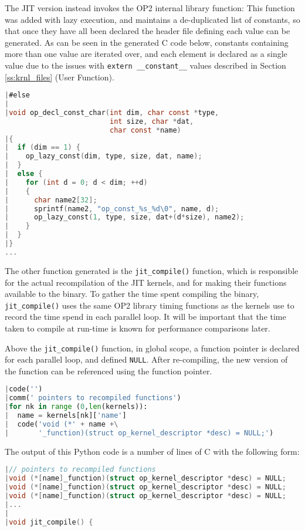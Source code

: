 The JIT version instead invokes the OP2 internal library function:
\noindent This function was added with lazy execution, and maintains a de-duplicated list of constants, so that once they have all been declared the header file defining each value can be generated. As can be seen in the generated C code below, constants containing more than one value are iterated over, and each element is declared as a single value due to the issues with \verb|extern __constant__| values described in Section \ref{ss:krnl_files} (User Function).
\begin{lstlisting}[backgroundcolor=\color{red!20}, language=C]
|#else
|
|void op_decl_const_char(int dim, char const *type,
                         int size, char *dat,
                         char const *name)
|{
|  if (dim == 1) {
|    op_lazy_const(dim, type, size, dat, name);
|  }
|  else {
|    for (int d = 0; d < dim; ++d)
|    {
|      char name2[32];
|      sprintf(name2, "op_const_%s_%d\0", name, d);
|      op_lazy_const(1, type, size, dat+(d*size), name2);
|    }
|  }
|}
...
\end{lstlisting}
\vspace{-1em}

The other function generated is the \verb|jit_compile()| function, which is responsible for the actual recompilation of the JIT kernels, and for making their functions available to the binary. To gather the time spent compiling the binary, \verb|jit_compile()| uses the same OP2 library timing functions as the kernels use to record the time spend in each parallel loop. It will be important that the time taken to compile at run-time is known for performance comparisons later.
\par
Above the \verb|jit_compile()| function, in global scope, a function pointer is declared for each parallel loop, and defined \verb|NULL|. After re-compiling, the new version of the function can be referenced using the function pointer.

\begin{lstlisting}[backgroundcolor=\color{lightgray!20}, language=Python]
|code('')
|comm(' pointers to recompiled functions')
|for nk in range (0,len(kernels)):
|  name = kernels[nk]['name']
|  code('void (*' + name +\
|       '_function)(struct op_kernel_descriptor *desc) = NULL;')
\end{lstlisting}
\noindent The output of this Python code is a number of lines of C with the following form:
\begin{lstlisting}[backgroundcolor=\color{red!20}, language=C]
|// pointers to recompiled functions
|void (*[name]_function)(struct op_kernel_descriptor *desc) = NULL;
|void (*[name]_function)(struct op_kernel_descriptor *desc) = NULL;
|void (*[name]_function)(struct op_kernel_descriptor *desc) = NULL;
|...
|
|void jit_compile() {
\end{lstlisting}

